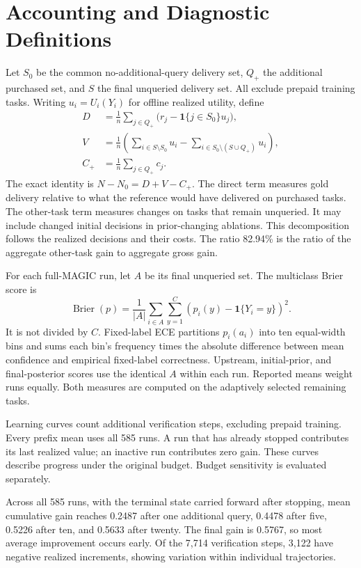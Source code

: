 \documentclass[journal]{IEEEtran}
\newcommand{\ind}{\mathbf{1}}
\begin{document}
\section{Accounting and Diagnostic Definitions}
\label{app:accounting}
Let $S_0$ be the common no-additional-query delivery set, $Q_+$ the additional purchased set, and $S$ the final unqueried delivery set. All exclude prepaid training tasks. Writing $u_i=U_i(Y_i)$ for offline realized utility, define
\begin{align}
 D&=\frac1n\sum_{j\in Q_+}\big(r_j-\ind\{j\in S_0\}u_j\big),\\
 V&=\frac1n\left(\sum_{i\in S\setminus S_0}u_i-
 \sum_{i\in S_0\setminus(S\cup Q_+)}u_i\right),\\
 C_+&=\frac1n\sum_{j\in Q_+}c_j.
\end{align}
The exact identity is $N-N_0=D+V-C_+$. The direct term measures gold delivery relative to what the reference would have delivered on purchased tasks. The other-task term measures changes on tasks that remain unqueried. It may include changed initial decisions in prior-changing ablations. This decomposition follows the realized decisions and their costs. The ratio 82.94\% is the ratio of the aggregate other-task gain to aggregate gross gain.

For each full-MAGIC run, let $A$ be its final unqueried set. The multiclass Brier score is
\begin{equation}
 \operatorname{Brier}(p)=\frac1{|A|}\sum_{i\in A}\sum_{y=1}^{C}
 (p_i(y)-\ind\{Y_i=y\})^2.
\end{equation}
It is not divided by $C$. Fixed-label ECE partitions $p_i(a_i)$ into ten equal-width bins and sums each bin's frequency times the absolute difference between mean confidence and empirical fixed-label correctness. Upstream, initial-prior, and final-posterior scores use the identical $A$ within each run. Reported means weight runs equally. Both measures are computed on the adaptively selected remaining tasks.

Learning curves count additional verification steps, excluding prepaid training. Every prefix mean uses all 585 runs. A run that has already stopped contributes its last realized value; an inactive run contributes zero gain. These curves describe progress under the original budget. Budget sensitivity is evaluated separately.

Across all 585 runs, with the terminal state carried forward after stopping, mean cumulative gain reaches 0.2487 after one additional query, 0.4478 after five, 0.5226 after ten, and 0.5633 after twenty. The final gain is 0.5767, so most average improvement occurs early. Of the 7,714 verification steps, 3,122 have negative realized increments, showing variation within individual trajectories.
\end{document}
